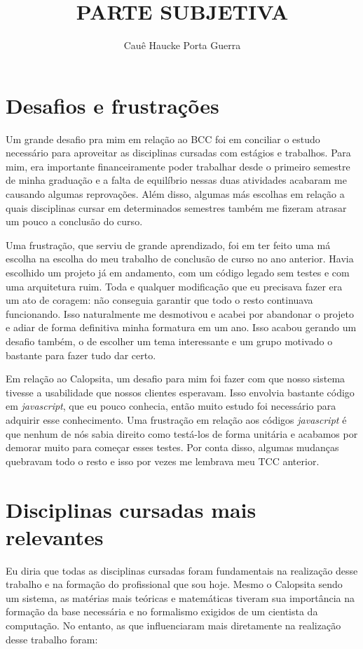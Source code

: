 \documentclass[titlepage,a4paper]{article}
\title{PARTE SUBJETIVA}
\author{Cauê Haucke Porta Guerra}
\newcommand{\calopsita}{Calopsita}
\begin{document}
\maketitle

\newpage


\section{Desafios e frustrações}

Um grande desafio pra mim em relação ao BCC foi em conciliar o estudo necessário para aproveitar as disciplinas cursadas com estágios e trabalhos. Para mim, era importante financeiramente poder trabalhar desde o primeiro semestre de minha graduação e a falta de equilíbrio nessas duas atividades acabaram me causando algumas reprovações. Além disso, algumas más escolhas em relação a quais disciplinas cursar em determinados semestres também me fizeram atrasar um pouco a conclusão do curso.

Uma frustração, que serviu de grande aprendizado, foi em ter feito uma má escolha na escolha do meu trabalho de conclusão de curso no ano anterior. Havia escolhido um projeto já em andamento, com um código legado sem testes e com uma arquitetura ruim. Toda e qualquer modificação que eu precisava fazer era um ato de coragem: não conseguia garantir que todo o resto continuava funcionando. Isso naturalmente me desmotivou e acabei por abandonar o projeto e adiar de forma definitiva minha formatura em um ano. Isso acabou gerando um desafio também, o de escolher um tema interessante e um grupo motivado o bastante para fazer tudo dar certo.

Em relação ao \calopsita{}, um desafio para mim foi fazer com que nosso sistema tivesse a usabilidade que nossos clientes esperavam. Isso envolvia bastante código em \textit{javascript}, que eu pouco conhecia, então muito estudo foi necessário para adquirir esse conhecimento. Uma frustração em relação aos códigos \textit{javascript} é que nenhum de nós sabia direito como testá-los de forma unitária e acabamos por demorar muito para começar esses testes. Por conta disso, algumas mudanças quebravam todo o resto e isso por vezes me lembrava meu TCC anterior.


\section{Disciplinas cursadas mais relevantes}

Eu diria que todas as disciplinas cursadas foram fundamentais na realização desse trabalho e na formação do profissional que sou hoje. Mesmo o \calopsita{} sendo um sistema, as matérias mais teóricas e matemáticas tiveram sua importância na formação da base necessária e no formalismo exigidos de um cientista da computação. No entanto, as que influenciaram mais diretamente na realização desse trabalho foram:
\end{document}
